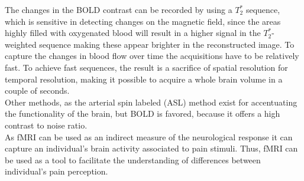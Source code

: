 The changes in the BOLD contrast can be recorded by using a $T_{2}^*$ sequence, which is sensitive in detecting changes on the magnetic field, since the areas highly filled with oxygenated blood will result in a higher signal in the $T_{2}^*$-weighted sequence making these appear brighter in the reconstructed image. To capture the changes in blood flow over time the acquisitions have to be relatively fast. To achieve fast sequences, the result is a sacrifice of spatial resolution for temporal resolution, making it possible to acquire a whole brain volume in a couple of seconds. \cite{Khanna2015,Lee2002} \\ 
Other methods, as the arterial spin labeled (ASL) method exist for accentuating the functionality of the brain, but BOLD is favored, because it offers a high contrast to noise ratio. \cite{Lee2002} \\ As fMRI can be used as an indirect measure of the neurological response it can capture an individual’s brain activity associated to pain stimuli. Thus, fMRI can be used as a tool to facilitate the understanding of differences between individual’s pain perception.  

